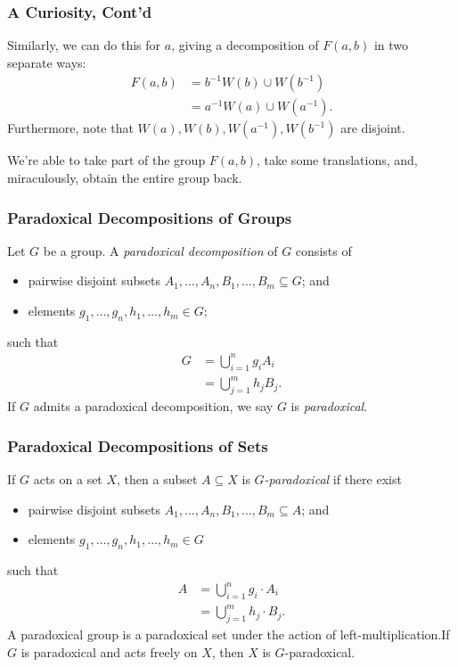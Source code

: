 \documentclass{beamer-custom}
\begin{document}
\begin{frame}
  \frametitle{A Curiosity, Cont'd}
  Similarly, we can do this for $a$, giving a decomposition of $F(a,b)$ in two separate ways:
  \begin{align*}
    F(a,b) &= b^{-1}W(b)\cup W\left( b^{-1} \right)\\
           &= a^{-1}W(a)\cup W\left( a^{-1} \right).
  \end{align*}\pause
  Furthermore, note that $W\left( a \right),W\left( b \right),W\left( a^{-1} \right),W\left( b^{-1} \right)$ are disjoint.\pause\newline

  We're able to take part of the group $F(a,b)$, take some translations, and, miraculously, obtain the entire group back.
\end{frame}
\begin{frame}
  \frametitle{Paradoxical Decompositions of Groups}
  Let $G$ be a group. A \textit{paradoxical decomposition} of $G$ consists of
  \begin{itemize}
    \item pairwise disjoint subsets $A_1,\dots,A_n,B_1,\dots,B_m\subseteq G$; and
    \item elements $g_1,\dots,g_n,h_1,\dots,h_m\in G$;
  \end{itemize}
  such that
  \begin{align*}
    G &= \bigcup_{i=1}^{n}g_iA_i\\
      &= \bigcup_{j=1}^{m}h_jB_j.
  \end{align*}\pause
  If $G$ admits a paradoxical decomposition, we say $G$ is \textit{paradoxical}.
\end{frame}
\begin{frame}
  \frametitle{Paradoxical Decompositions of Sets}
  If $G$ acts on a set $X$, then a subset $A\subseteq X$ is \textit{$G$-paradoxical} if there exist
  \begin{itemize}
    \item pairwise disjoint subsets $A_1,\dots,A_n,B_1,\dots,B_m\subseteq A$; and
    \item elements $g_1,\dots,g_n,h_1,\dots,h_m\in G$
  \end{itemize}
  such that
  \begin{align*}
    A &= \bigcup_{i=1}^{n}g_i\cdot A_i\\
      &= \bigcup_{j=1}^{m}h_j\cdot B_j.
  \end{align*}\pause
  A paradoxical group is a paradoxical set under the action of left-multiplication.\pause\:If $G$ is paradoxical and acts freely on $X$, then $X$ is $G$-paradoxical.
\end{frame}
\end{document}

